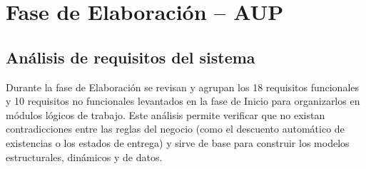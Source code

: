 \section{Fase de Elaboración -- AUP}

\subsection{Análisis de requisitos del sistema}
Durante la fase de Elaboración se revisan y agrupan los 18 requisitos funcionales y 10 requisitos no funcionales levantados en la fase de Inicio para organizarlos en módulos lógicos de trabajo. Este análisis permite verificar que no existan contradicciones entre las reglas del negocio (como el descuento automático de existencias o los estados de entrega) y sirve de base para construir los modelos estructurales, dinámicos y de datos.

